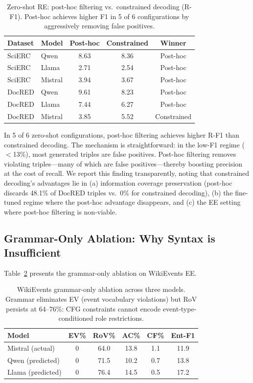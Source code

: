 \documentclass[11pt]{article}
\begin{document}
\begin{table}[t]
\centering
\small
\caption{Zero-shot RE: post-hoc filtering vs.\ constrained decoding (R-F1). Post-hoc achieves higher F1 in 5 of 6 configurations by aggressively removing false positives.}
\label{tab:posthoc_vs_constrained}
\begin{tabular}{llccc}
\toprule
\textbf{Dataset} & \textbf{Model} & \textbf{Post-hoc} & \textbf{Constrained} & \textbf{Winner} \\
\midrule
SciERC  & Qwen    & 8.63 & 8.36 & Post-hoc \\
SciERC  & Llama   & 2.71 & 2.54 & Post-hoc \\
SciERC  & Mistral & 3.94 & 3.67 & Post-hoc \\
DocRED  & Qwen    & 9.61 & 8.23 & Post-hoc \\
DocRED  & Llama   & 7.44 & 6.27 & Post-hoc \\
DocRED  & Mistral & 3.85 & 5.52 & Constrained \\
\bottomrule
\end{tabular}
\end{table}

In 5 of 6 zero-shot configurations, post-hoc filtering achieves higher R-F1 than constrained decoding.
The mechanism is straightforward: in the low-F1 regime ($<$13\%), most generated triples are false positives.
Post-hoc filtering removes violating triples---many of which are false positives---thereby boosting precision at the cost of recall.
We report this finding transparently, noting that constrained decoding's advantages lie in (a) information coverage preservation (post-hoc discards 48.1\% of DocRED triples vs.\ 0\% for constrained decoding), (b) the fine-tuned regime where the post-hoc advantage disappears, and (c) the EE setting where post-hoc filtering is non-viable.


\subsection{Grammar-Only Ablation: Why Syntax is Insufficient}
\label{sec:grammar_ablation}

Table~\ref{tab:grammar_only_ee} presents the grammar-only ablation on WikiEvents EE.

\begin{table}[t]
\centering
\small
\caption{WikiEvents grammar-only ablation across three models. Grammar eliminates EV (event vocabulary violations) but RoV persists at 64--76\%: CFG constraints cannot encode event-type-conditioned role restrictions.}
\label{tab:grammar_only_ee}
\begin{tabular}{lccccc}
\toprule
\textbf{Model} & \textbf{EV\%} & \textbf{RoV\%} & \textbf{AC\%} & \textbf{CF\%} & \textbf{Ent-F1} \\
\midrule
Mistral (actual)   & 0 & 64.0 & 13.8 & 1.1  & 11.9 \\
Qwen (predicted)   & 0 & 71.5 & 10.2 & 0.7  & 13.8 \\
Llama (predicted)  & 0 & 76.4 & 14.5 & 0.5  & 17.2 \\
\bottomrule
\end{tabular}
\end{table}
\end{document}
